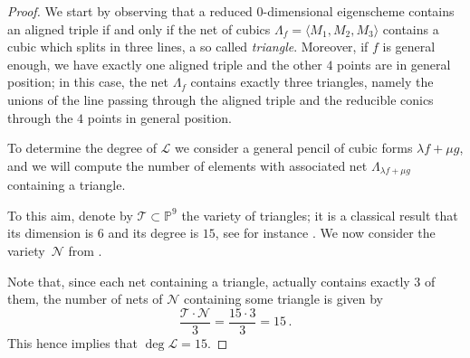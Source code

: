 \documentclass[11pt, a4paper, reqno, captions=tableheading,bibliography=totoc]{scrartcl}
\theoremstyle{plain}
\theoremstyle{definition}
\newcommand{\p}{\mathbb{P}}
\newcommand{\comment}[1]{}
\begin{document}
\begin{proof}
We start by observing that a reduced $0$-dimensional eigenscheme contains an aligned triple if and only if the net of cubics $\Lambda_f = \langle M_1, M_2, M_3 \rangle$ contains a cubic which splits in three lines, a so called \emph{triangle}. Moreover, if $f$ is general enough, we have exactly one aligned triple and the other $4$ points are in general position; in this case, the net $\Lambda_f$ contains exactly three triangles, namely the unions of the line passing through the aligned triple and the reducible conics through the $4$ points in general position.

To determine the degree of $\mathcal L$ we consider a general pencil of cubic forms $\lambda f + \mu g$, and we will compute the number of elements with associated net $\Lambda_{\lambda f + \mu g}$ containing a triangle.

To this aim, denote by ${\mathcal T} \subset \p^9$ the variety of triangles; it is a classical result that its dimension is $6$ and its degree is $15$,
see for instance \cite[Section 2.2.2]{3264}. We now consider the variety~${\mathcal N}$ from .
\comment{
given by the union of the nets of cubics of the pencil
$$
{\mathcal N} = \bigcup_{(\lambda : \mu) \in \p^1} \Lambda_{\lambda f + \mu g} \subset \p^9.
$$
Observe that we can assume that ${\mathcal N}$ is an embedding of a rational projective bundle; indeed, it can be seen as an immersion of the $\p^2$-bundle over $\p^1$ given by the family the planes ${\mathcal P}=
\{\Lambda_{\lambda f + \mu g}\ : \ (\lambda:\mu)\in \p^1\} \subset \p^1 \times \p^9$. The map ${\mathcal P} \to {\mathcal N}$ contracts no subvariety of any plane of ${\mathcal P}$, so it is either an embedding or it contracts some horizontal curve. In the latter case, all the planes of the family should intersect in at least one point. In particular, the two nets $\Lambda_f$ and $\Lambda_g$ should have non-empty intersection.
If we denote by $M_1$, $M_2$ and $M_3$ the $2 \times 2$ minors relative to $f$, and by $N_1$, $N_2$ and $N_3$ the ones relative to $g$, the vectorial dimension of the linear span
$\langle M_1,M_2,M_3,N_1,N_2,N_3
\rangle$ should be strictly less than $6$. This can be avoided, since such a condition corresponds to a proper closed subscheme of $\p^9 \times \p^9$.

It follows that if ${\mathcal N}$ is general enough, it is a $3$-dimensional rational normal scroll in $\p(\langle M_1,M_2,M_3,N_1,N_2,N_3
\rangle) \cong \p^5$, and being a variety of minimal degree, its degree is $\deg {\mathcal N}=5+1-3=3$.
}
Note that, since each net containing a triangle, actually contains exactly $3$ of them, the number of nets of ${\mathcal N}$ containing some triangle is given by
%
\[
\frac {{\mathcal T} \cdot {\mathcal N}}{3} =\frac{{15} \cdot {3}}{3}=15 \,.
\]
%
This hence implies that $\deg {\mathcal L} = 15$.
\end{proof}
\end{document}
